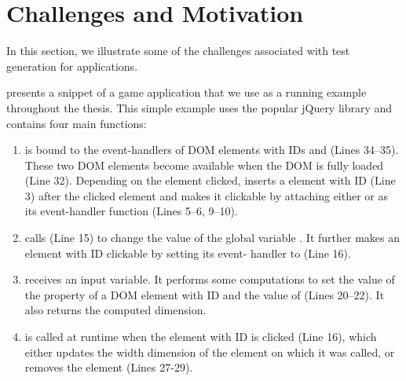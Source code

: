 \section{Challenges and Motivation} \label{Sec:motivation}

 

In this section, we illustrate some of the challenges associated with test generation for \javascript applications. 
%

 presents a snippet of a \javascript game application that we use as a running example throughout the thesis. This simple example uses the popular jQuery library \cite{jquery-api} and contains four main \javascript functions: 

\begin{enumerate} [noitemsep]

\item {} is bound to the event-handlers of DOM elements with IDs  and   (Lines 34--35). These two DOM elements become available when the DOM is fully loaded (Line 32). Depending on the element clicked,  inserts a  element with ID  (Line 3) after the clicked element and makes it clickable by attaching either  or  as its event-handler function (Lines 5--6, 9--10).    

\item {} calls  (Line 15) to change the value of the global variable . It further makes an element with ID  clickable by setting its event- handler to  (Line 16).

\item {} receives an input variable. It performs some computations to set the  value of the  property of a DOM element with ID   and the value of  (Lines 20--22). It also returns the computed dimension.

\item {} is called at runtime when the element with ID  is clicked (Line 16), which either updates the width dimension of the element on which it was called, or removes the element (Lines 27-29).
\end{enumerate}

